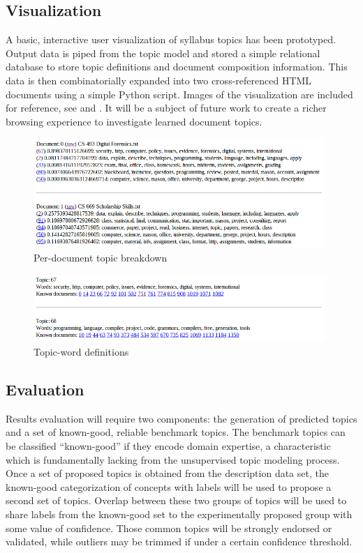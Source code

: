\subsection{Visualization}

A basic, interactive user visualization of syllabus topics has been
prototyped. Output data is piped from the topic model and stored a simple
relational database to store topic definitions and document composition
information. This data is then combinatorially expanded into two
cross-referenced HTML documents using a simple Python script. Images of the
visualization are included for reference, see  and
. It will be a subject of future work to create a
richer browsing experience to investigate learned document topics.

\begin{figure}[ht]
\centering
\includegraphics[width=0.98\textwidth]{figures/vis-docs.png}
\caption{Per-document topic breakdown\label{fig:vis-docs}}
\end{figure}

\begin{figure}[ht]
\centering
\includegraphics[width=0.98\textwidth]{figures/vis-topics.png}
\caption{Topic-word definitions\label{fig:vis-topics}}
\end{figure}


\subsection{Evaluation}

Results evaluation will require two components: the generation of predicted
topics and a set of known-good, reliable benchmark topics. The benchmark
topics can be classified ``known-good'' if they encode domain expertise, a
characteristic which is fundamentally lacking from the unsupervised topic
modeling process. Once a set of proposed topics is obtained from the
description data set, the known-good categorization of concepts with labels
will be used to propose a second set of topics.  Overlap between these two
groups of topics will be used to share labels from the known-good set to
the experimentally proposed group with some value of confidence. Those
common topics will be strongly endorsed or validated, while outliers may be
trimmed if under a certain confidence threshold.

